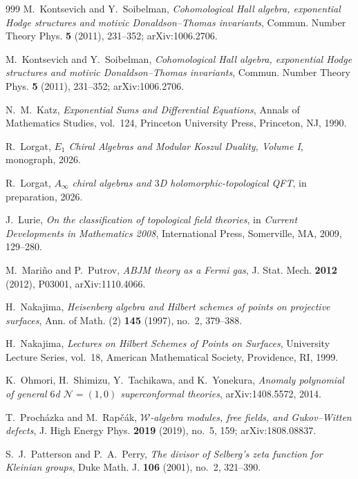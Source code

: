 \begin{thebibliography}{999}
M.~Kontsevich and Y.~Soibelman, \emph{Cohomological Hall algebra, exponential Hodge structures and motivic Donaldson--Thomas invariants}, Commun. Number Theory Phys. \textbf{5} (2011), 231--352; arXiv:1006.2706.

M.~Kontsevich and Y.~Soibelman, \emph{Cohomological Hall algebra, exponential Hodge structures and motivic Donaldson--Thomas invariants}, Commun. Number Theory Phys. \textbf{5} (2011), 231--352; arXiv:1006.2706.

N.~M.~Katz, \emph{Exponential Sums and Differential Equations}, Annals of Mathematics Studies, vol.~124, Princeton University Press, Princeton, NJ, 1990.

R.~Lorgat, \emph{$E_1$ Chiral Algebras and Modular Koszul Duality, Volume I}, monograph, 2026.

R.~Lorgat, \emph{$A_\infty$ chiral algebras and $3$D holomorphic-topological QFT}, in preparation, 2026.

J.~Lurie, \emph{On the classification of topological field theories}, in \emph{Current Developments in Mathematics 2008}, International Press, Somerville, MA, 2009, 129--280.

M.~Mari\~no and P.~Putrov, \emph{ABJM theory as a Fermi gas}, J. Stat. Mech. \textbf{2012} (2012), P03001, arXiv:1110.4066.

H.~Nakajima, \emph{Heisenberg algebra and Hilbert schemes of points on projective surfaces}, Ann. of Math. (2) \textbf{145} (1997), no.~2, 379--388.

H.~Nakajima, \emph{Lectures on Hilbert Schemes of Points on Surfaces}, University Lecture Series, vol.~18, American Mathematical Society, Providence, RI, 1999.

K.~Ohmori, H.~Shimizu, Y.~Tachikawa, and K.~Yonekura, \emph{Anomaly polynomial of general $6$d $\mathcal{N}=(1,0)$ superconformal theories}, arXiv:1408.5572, 2014.

T.~Proch\'azka and M.~Rap\v{c}\'ak, \emph{$\mathcal{W}$-algebra modules, free fields, and Gukov--Witten defects}, J. High Energy Phys. \textbf{2019} (2019), no.~5, 159; arXiv:1808.08837.

S.~J.~Patterson and P.~A.~Perry, \emph{The divisor of Selberg's zeta function for Kleinian groups}, Duke Math. J. \textbf{106} (2001), no.~2, 321--390.


\end{thebibliography}
